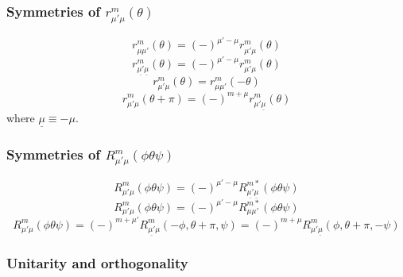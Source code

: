 \subsubsection*{Symmetries of $r_{\mu'\mu}^{m}(\theta)$}

\begin{equation}
r_{\mu\mu'}^{m}(\theta)=(-)^{\mu'-\mu}r_{\mu'\mu}^{m}(\theta)
\end{equation}
\begin{equation}
r_{\underline{\mu'}\underline{\mu}}^{m}(\theta)=\left(-\right)^{\mu'-\mu}r_{\mu'\mu}^{m}(\theta)
\end{equation}
\begin{equation}
r_{\mu'\mu}^{m}(\theta)=r_{\mu\mu'}^{m}(-\theta)
\end{equation}
\begin{equation}
r_{\mu'\mu}^{m}(\theta+\pi)=(-)^{m+\mu}r_{\mu'\underline{\mu}}^{m}(\theta)
\end{equation}
where $\underline{\mu}\equiv-\mu$.


\subsubsection*{Symmetries of $R_{\mu'\mu}^{m}(\phi\theta\psi)$}

\begin{equation}
R_{\mu'\mu}^{m}(\phi\theta\psi)=\left(-\right)^{\mu'-\mu}R_{\underline{\mu'}\underline{\mu}}^{m*}(\phi\theta\psi)\label{eq:symm-gsh-1}
\end{equation}
\begin{equation}
R_{\mu'\mu}^{m}(\phi\theta\psi)=\left(-\right)^{\mu'-\mu}R_{\mu\mu'}^{m*}(\phi\theta\psi)
\end{equation}
\begin{equation}
R_{\mu'\mu}^{m}(\phi\theta\psi)=(-)^{m+\mu'}R_{\underline{\mu'}\mu}^{m}(-\phi,\theta+\pi,\psi)=(-)^{m+\mu}R_{\mu'\underline{\mu}}^{m}(\phi,\theta+\pi,-\psi)
\end{equation}



\subsubsection*{Unitarity and orthogonality}


